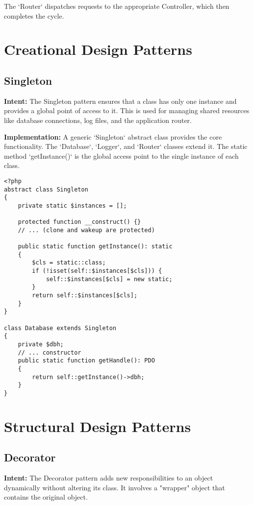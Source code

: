 \documentclass[11pt,a4paper]{article}
\begin{document}
The `Router` dispatches requests to the appropriate Controller, which then completes the cycle.

\section{Creational Design Patterns}

\subsection{Singleton}
\textbf{Intent:} The Singleton pattern ensures that a class has only one instance and provides a global point of access to it. This is used for managing shared resources like database connections, log files, and the application router.

\textbf{Implementation:} A generic `Singleton` abstract class provides the core functionality. The `Database`, `Logger`, and `Router` classes extend it. The static method `getInstance()` is the global access point to the single instance of each class.

\begin{lstlisting}[caption={The Singleton base class and Database implementation.}, label={lst:singleton}]
% Filepath: src\core\singletons.php
<?php
abstract class Singleton
{
	private static $instances = [];

	protected function __construct() {}
	// ... (clone and wakeup are protected)

	public static function getInstance(): static
	{
		$cls = static::class;
		if (!isset(self::$instances[$cls])) {
			self::$instances[$cls] = new static;
		}
		return self::$instances[$cls];
	}
}

class Database extends Singleton
{
	private $dbh;
    // ... constructor
	public static function getHandle(): PDO
	{
		return self::getInstance()->dbh;
	}
}
\end{lstlisting}

\section{Structural Design Patterns}

\subsection{Decorator}
\textbf{Intent:} The Decorator pattern adds new responsibilities to an object dynamically without altering its class. It involves a "wrapper" object that contains the original object.
\end{document}
